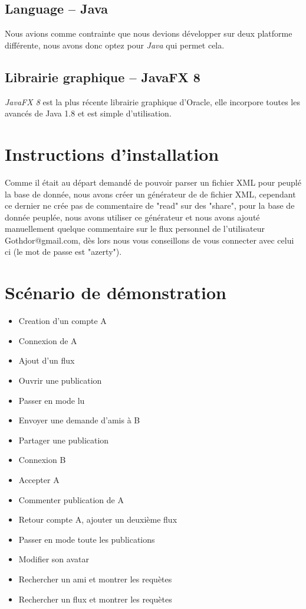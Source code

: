 \documentclass[a4paper,10pt]{article}
\begin{document}
\subsection{Language -- Java}
Nous avions comme contrainte que nous devions développer sur deux platforme différente, nous avons donc optez pour \emph{Java} qui permet cela.
\subsection{Librairie graphique -- JavaFX 8}
\emph{JavaFX 8} est la plus récente librairie graphique d'Oracle, elle incorpore toutes les avancés de Java 1.8 et est simple d'utilisation.
		
\section{Instructions d'installation}

Comme il était au départ demandé de pouvoir parser un fichier XML pour peuplé la base de donnée, nous avons créer un générateur de de fichier XML, cependant ce dernier ne crée pas de commentaire de "read" sur des "share", pour la base de donnée peuplée, nous avons utiliser ce générateur et nous avons ajouté manuellement quelque commentaire sur le flux personnel de l'utilisateur Gothdor@gmail.com, dès lors nous vous conseillons de vous connecter avec celui ci (le mot de passe est "azerty").
		
\section{Scénario de démonstration}
\begin{itemize}
\item Creation d'un compte A
\item Connexion de A
\item Ajout d'un flux
\item Ouvrir une publication
\item Passer en mode lu
\item Envoyer une demande d'amis à B
\item Partager une publication
\item Connexion B
\item Accepter A
\item Commenter publication de A
\item Retour compte A, ajouter un deuxième flux
\item Passer en mode toute les publications
\item Modifier son avatar
\item Rechercher un ami et montrer les requètes
\item Rechercher un flux et montrer les requètes
\end{itemize}
		
\end{document}
